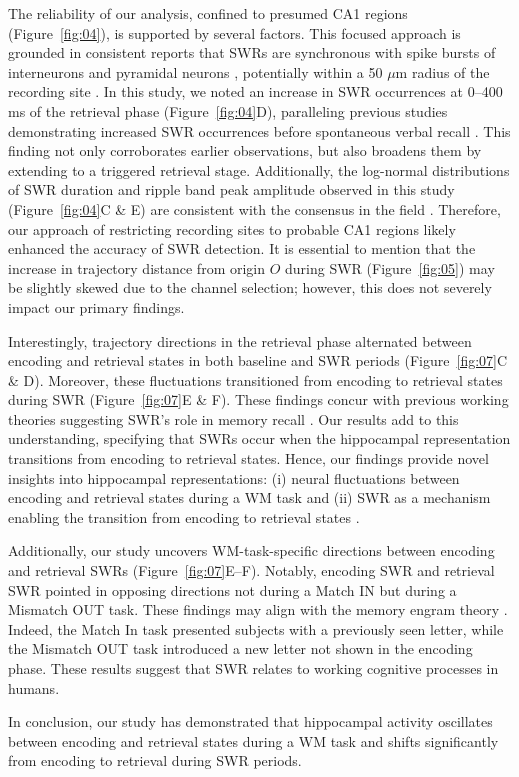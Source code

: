 The reliability of our analysis, confined to presumed CA1 regions (Figure~\ref{fig:04}), is supported by several factors. This focused approach is grounded in consistent reports that SWRs are synchronous with spike bursts of interneurons and pyramidal neurons \cite{buzsaki_two-stage_1989} \cite{quyen_cell_2008} \cite{royer_control_2012} \cite{hajos_input-output_2013}, potentially within a 50 $\mu$m radius of the recording site \cite{schomburg_spiking_2012}. In this study, we noted an increase in SWR occurrences at 0--400 ms of the retrieval phase (Figure~\ref{fig:04}D), paralleling previous studies demonstrating increased SWR occurrences before spontaneous verbal recall \cite{norman_hippocampal_2019} \cite{norman_hippocampal_2021}. This finding not only corroborates earlier observations, but also broadens them by extending to a triggered retrieval stage. Additionally, the log-normal distributions of SWR duration and ripple band peak amplitude observed in this study (Figure~\ref{fig:04}C & E) are consistent with the consensus in the field \cite{liu_consensus_2022}. Therefore, our approach of restricting recording sites to probable CA1 regions likely enhanced the accuracy of SWR detection. It is essential to mention that the increase in trajectory distance from origin $O$ during SWR (Figure~\ref{fig:05}) may be slightly skewed due to the channel selection; however, this does not severely impact our primary findings.

Interestingly, trajectory directions in the retrieval phase alternated between encoding and retrieval states in both baseline and SWR periods (Figure~\ref{fig:07}C \& D). Moreover, these fluctuations transitioned from encoding to retrieval states during SWR (Figure~\ref{fig:07}E \& F). These findings concur with previous working theories suggesting SWR’s role in memory recall \cite{norman_hippocampal_2019} \cite{norman_hippocampal_2021}. Our results add to this understanding, specifying that SWRs occur when the hippocampal representation transitions from encoding to retrieval states. Hence, our findings provide novel insights into hippocampal representations: (i) neural fluctuations between encoding and retrieval states during a WM task and (ii) SWR as a mechanism enabling the transition from encoding to retrieval states \cite{buzsaki_hippocampal_2015}.

Additionally, our study uncovers WM-task-specific directions between encoding and retrieval SWRs (Figure~\ref{fig:07}E--F). Notably, encoding SWR and retrieval SWR pointed in opposing directions not during a Match IN but during a Mismatch OUT task. These findings may align with the memory engram theory \cite{liu_optogenetic_2012}. Indeed, the Match In task presented subjects with a previously seen letter, while the Mismatch OUT task introduced a new letter not shown in the encoding phase. These results suggest that SWR relates to working cognitive processes in humans.

In conclusion, our study has demonstrated that hippocampal activity oscillates between encoding and retrieval states during a WM task and shifts significantly from encoding to retrieval during SWR periods.

\label{sec:discussion}